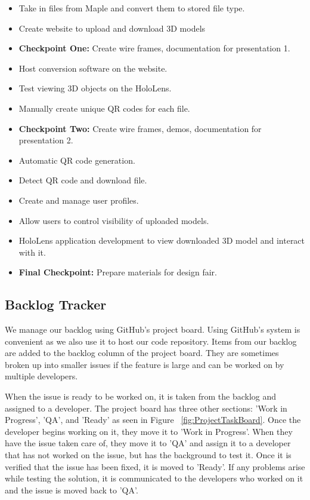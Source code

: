 \begin{itemize}
\item Take in files from Maple and convert them to stored file type.
\item Create website to upload and download 3D models
\item \textbf{Checkpoint One:} Create wire frames, documentation for presentation 1.
\item Host conversion software on the website.
\item Test viewing 3D objects on the HoloLens.
\item Manually create unique QR codes for each file. 
\item \textbf{Checkpoint Two:} Create wire frames, demos, documentation for presentation 2.
\item Automatic QR code generation.
\item Detect QR code and download file.
\item Create and manage user profiles.
\item Allow users to control visibility of uploaded models.
\item HoloLens application development to view downloaded 3D model and interact 
with it.
\item \textbf{Final Checkpoint:} Prepare materials for design fair.
\end{itemize}

\subsection{Backlog Tracker}

We manage our backlog using GitHub's project board. Using GitHub's system is 
convenient as we also use it to host our code repository. Items from our backlog 
are added to the backlog column of the project board. They are sometimes broken 
up into smaller issues if the feature is large and can be worked on by multiple 
developers.

When the issue is ready to be worked on, it is taken from the backlog and 
assigned to a developer. The project board has three other sections: 
'Work in Progress', 'QA', and 'Ready' as seen in Figure 
~\ref{fig:ProjectTaskBoard}. Once the developer begins working on it, 
they move it to 'Work in Progress'. When they have the issue taken care of, they
move it to 'QA' and assign it to a developer that has not worked on the issue, 
but has the background to test it. Once it is verified that the issue has been 
fixed, it is moved to 'Ready'. If any problems arise while testing the solution,
it is communicated to the developers who worked on it and the issue is moved 
back to 'QA'.

